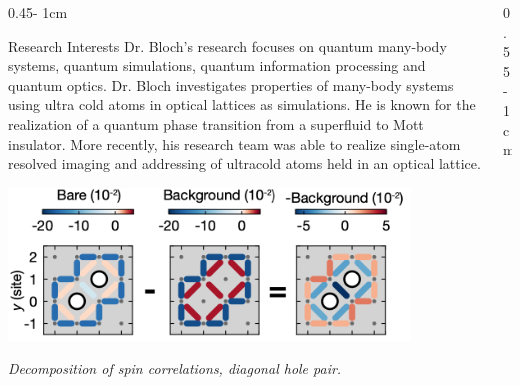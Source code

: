 \documentclass{../psuposter}
\begin{document}
\begin{frame}
\begin{columns}[t, totalwidth=\textwidth]
\begin{column}{0.45\textwidth - 1cm}
    \begin{block}{Research Interests}
        Dr. Bloch's research focuses on quantum many-body systems, quantum simulations, quantum information processing and quantum optics. Dr. Bloch investigates properties of many-body systems using ultra cold atoms in optical lattices as simulations. He is known for the realization of a quantum phase transition from a superfluid to Mott insulator. \cite{weitenbergSinglespinAddressingAtomic2011} 
        More recently, his research team was able to realize single-atom resolved imaging and addressing of ultracold atoms held in an optical lattice. \cite{shersonSingleatomresolvedFluorescenceImaging2010}
        \begin{center}
	    	\includegraphics[width=0.85\textwidth]{images/diag-hole}    		
    	\end{center}
    	\textit{Decomposition of spin correlations, diagonal hole pair.} \cite{koepsellMicroscopicEvolutionDoped2020}
    \end{block}
\end{column}
\begin{column}{0.55\textwidth - 1cm}



\end{column}
\end{columns}
\end{frame}
\end{document}

